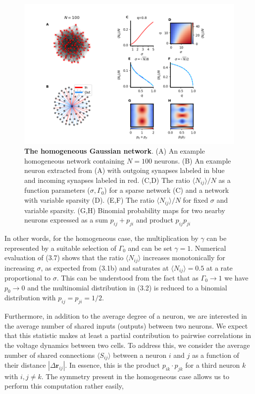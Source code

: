\documentclass{ucetd}
\begin{document}
\begin{figure}[t!]
\centering
\includegraphics[width=175mm]{figure-8}
\caption{\textbf{The homogeneous Gaussian network}. (A) An example homogeneous network containing $N=100$ neurons. (B) An example neuron extracted from (A) with outgoing synapses labeled in blue and incoming synapses labeled in red. (C,D) The ratio $\langle N_{ij}\rangle/N$ as a function parameters ($\sigma, \Gamma_{0}$) for a sparse network (C) and a network with variable sparsity (D). (E,F) The ratio $\langle N_{ij}\rangle/N$ for fixed $\sigma$ and variable sparsity. (G,H) Binomial probability maps for two nearby neurons expressed as a sum $p_{ij}+p_{ji}$ and product $p_{ij}p_{ji}$}
\end{figure}

In other words, for the homogeneous case, the multiplication by $\gamma$ can be represented by a suitable selection of $\Gamma_{0}$ and can be set $\gamma=1$. Numerical evaluation of (3.7) shows that the ratio $\langle N_{ij}\rangle$ increases monotonically for increasing $\sigma$, as expected from (3.1b) and saturates at $\langle N_{ij}\rangle = 0.5$ at a rate proportional to $\sigma$. This can be understood from the fact that as $\Gamma_{0} \rightarrow 1$ we have $p_{0} \rightarrow 0$ and the multinomial distribution in (3.2) is reduced to a binomial distribution with $p_{ij} = p_{ji} = 1/2$. 

Furthermore, in addition to the average degree of a neuron, we are interested in the average number of shared inputs (outputs) between two neurons. We expect that this statistic makes at least a partial contribution to pairwise correlations in the voltage dynamics between two cells. To address this, we consider the average number of shared connections $\langle S_{ij} \rangle$ between a neuron $i$ and $j$ as a function of their distance $|\Delta \mathbf{r}_{ij}|$. In essence, this is the product $p_{ik}\cdot p_{jk}$ for a third neuron $k$ with $i,j\neq k$. The symmetry present in the homogeneous case allows us to perform this computation rather easily,
\end{document}
